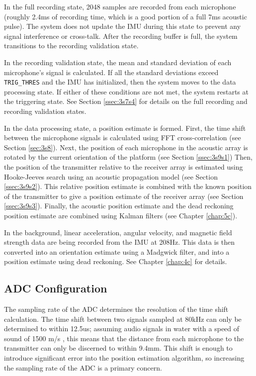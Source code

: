 \documentclass[12pt,a4paper]{report}
\begin{document}
In the full recording state, 2048 samples are recorded from each microphone (roughly 2.4ms of recording time, which is a good portion of a full 7ms acoustic pulse). The system does not update the IMU during this state to prevent any signal interference or cross-talk. After the recording buffer is full, the system transitions to the recording validation state.

In the recording validation state, the mean and standard deviation of each microphone’s signal is calculated. If all the standard deviations exceed \verb|TRIG_THRES| and the IMU has initialized, then the system moves to the data processing state. If either of these conditions are not met, the system restarts at the triggering state. See Section \ref{ssec:3s7s4} for details on the full recording and recording validation states.

In the data processing state, a position estimate is formed. First, the time shift between the microphone signals is calculated using FFT cross-correlation (see Section \ref{sec:3s8}). Next, the position of each microphone in the acoustic array is rotated by the current orientation of the platform (see Section \ref{ssec:3s9s1}) Then, the position of the transmitter relative to the receiver array is estimated using Hooke-Jeeves search using an acoustic propagation model (see Section \ref{ssec:3s9s2}). This relative position estimate is combined with the known position of the transmitter to give a position estimate of the receiver array (see Section \ref{ssec:3s9s3}). Finally, the acoustic position estimate and the dead reckoning position estimate are combined using Kalman filters (see Chapter \ref{chap:5c}).

In the background, linear acceleration, angular velocity, and magnetic field strength data are being recorded from the IMU at 208Hz. This data is then converted into an orientation estimate using a Madgwick filter, and into a position estimate using dead reckoning. See Chapter \ref{chap:4c} for details.

\subsection{ADC Configuration} \label{ssec:3s7s2}
The sampling rate of the ADC determines the resolution of the time shift calculation. The time shift between two signals sampled at 80kHz can only be determined to within 12.5us; assuming audio signals in water with a speed of sound of 1500 m/s \cite{computational}, this means that the distance from each microphone to the transmitter can only be discerned to within 9.4mm. This shift is enough to introduce significant error into the position estimation algorithm, so increasing the sampling rate of the ADC is a primary concern.
\end{document}
